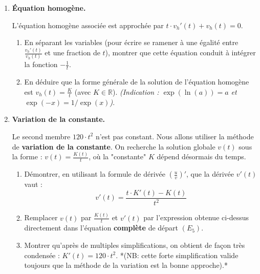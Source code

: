 \documentclass[a4paper,11pt]{article}
\begin{document}
\begin{enumerate}
    \item \textbf{Équation homogène.}
    
    L'équation homogène associée est approchée par $t \cdot v_h'(t) + v_h(t) = 0$.
    \begin{enumerate}
        \item En séparant les variables (pour écrire se ramener à une égalité entre $\frac{v_h'(t)}{v_h(t)}$ et une fraction de $t$), montrer que cette équation conduit à intégrer la fonction $-\frac{1}{t}$.
        \vspace{2cm}
        \item En déduire que la forme générale de la solution de l'équation homogène est $v_h(t) = \frac{K}{t}$ (avec $K \in \mathbb{R}$). 
        \textit{(Indication : $\exp(\ln(a)) = a$ et $\exp(-x) = 1/\exp(x)$)}.
        \vspace{4cm}
    \end{enumerate}
    
    \item \textbf{Variation de la constante.}
    
    Le second membre $120 \cdot t^2$ n'est pas constant. Nous allons utiliser la méthode de \textbf{variation de la constante}.
    On recherche la solution globale $v(t)$ sous la forme : $v(t) = \frac{K(t)}{t}$, où la "constante" $K$ dépend désormais du temps.
    
    \begin{enumerate}
        \item Démontrer, en utilisant la formule de dérivée $\left(\frac{u}{v}\right)'$, que la dérivée $v'(t)$ vaut :
        \[
        v'(t) = \frac{t \cdot K'(t) - K(t)}{t^2}
        \]
        \vspace{3cm}
        \item Remplacer $v(t)$ par $\frac{K(t)}{t}$ et $v'(t)$ par l'expression obtenue ci-dessus directement dans l'équation \textbf{complète} de départ $(E_5)$. 
        \vspace{3cm}
        \item Montrer qu'après de multiples simplifications, on obtient de façon très condensée : $K'(t) = 120 \cdot t^2$. 
        *(NB: cette forte simplification valide toujours que la méthode de la variation est la bonne approche).*
        \vspace{2.5cm}
    \end{enumerate}
    

\end{enumerate}
\end{document}
